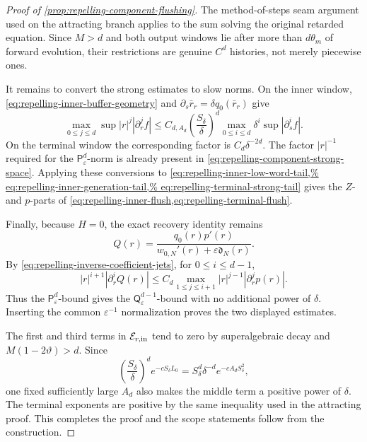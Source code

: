 \begin{proof}[Proof of
\cref{prop:repelling-component-flushing}]
The method-of-steps seam argument used on the attracting branch applies to
the sum solving the original retarded equation.  Since \(M>d\) and both
output windows lie after more than \(d\theta_m\) of forward evolution, their
restrictions are genuine \(C^d\) histories, not merely piecewise ones.

It remains to convert the strong estimates to slow norms.  On the inner
window, \cref{eq:repelling-inner-buffer-geometry} and
\(\partial_s\bar r_r=\delta q_0(\bar r_r)\) give
\begin{equation}
 \max_{0\le j\le d}\sup |r|^j|\partial_r^jf|
 \le C_{d,A_d}\left(\frac{S_\delta}{\delta}\right)^d
       \max_{0\le i\le d}\delta^i\sup|\partial_s^if|.        \label{eq:repelling-inner-strong-to-slow}
\end{equation}
On the terminal window the corresponding factor is
\(C_d\delta^{-2d}\).  The factor \(|r|^{-1}\) required for the
\(\mathsf P_\varepsilon^d\)-norm is already present in
\cref{eq:repelling-component-strong-space}.  Applying these conversions to
\cref{eq:repelling-inner-low-word-tail,%
eq:repelling-inner-generation-tail,%
eq:repelling-terminal-strong-tail} gives the \(Z\)- and \(p\)-parts of
\cref{eq:repelling-inner-flush,eq:repelling-terminal-flush}.

Finally, because \(H=0\), the exact recovery identity remains
\begin{equation}
 Q(r)=\frac{q_0(r)p'(r)}
              {w_{0,N}'(r)+\varepsilon\mathfrak d_N(r)}.      \label{eq:repelling-Q-from-p}
\end{equation}
By \cref{eq:repelling-inverse-coefficient-jets}, for \(0\le i\le d-1\),
\[
 |r|^{i+1}|\partial_r^iQ(r)|
 \le C_d\max_{1\le j\le i+1}
          |r|^{j-1}|\partial_r^jp(r)|.
\]
Thus the \(\mathsf P_\varepsilon^d\)-bound gives the
\(\mathsf Q_\varepsilon^{d-1}\)-bound with no additional power of
\(\delta\).
Inserting the common \(\varepsilon^{-1}\) normalization proves the two
displayed estimates.

The first and third terms in \(\mathcal E_{r,\rm in}\) tend to zero by
superalgebraic decay and
\(M(1-2\vartheta)>d\).  Since
\[
 \left(\frac{S_\delta}{\delta}\right)^d
 e^{-cS_\delta L_0}
 =S_\delta^d\delta^{-d}
       e^{-cA_dS_\delta^2},
\]
one fixed sufficiently large \(A_d\) also makes the middle term a positive
power of \(\delta\).  The terminal exponents are positive by the same
inequality used in the attracting proof.  This completes the proof and the
scope statements follow from the construction.
\end{proof}

